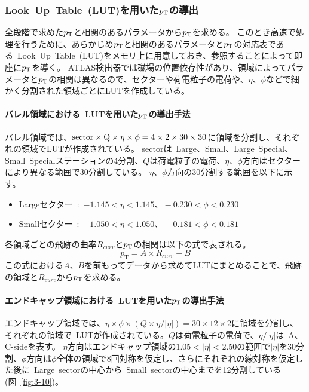 \subsubsection{Look~Up~Table~(LUT)を用いた$p_\mathrm{T}$の導出}
全段階で求めた$p_\mathrm{T}$と相関のあるパラメータから$p_\mathrm{T}$を求める。
このとき高速で処理を行うために、あらかじめ$p_\mathrm{T}$と相関のあるパラメータと$p_\mathrm{T}$の対応表である~Look~Up~Table~(LUT)をメモリ上に用意しておき、参照することによって即座に$p_\mathrm{T}$を導く。
ATLAS検出器では磁場の位置依存性があり、領域によってパラメータと$p_\mathrm{T}$の相関は異なるので、セクターや荷電粒子の電荷や、$\eta$、$\phi$などで細かく分割された領域ごとにLUTを作成している。

\paragraph{バレル領域における~LUTを用いた$p_\mathrm{T}$の導出手法}
バレル領域では、$\rm{sector}\times Q \times \eta \times \phi = 4\times2\times30\times30$に領域を分割し、それぞれの領域でLUTが作成されている。
sectorは~Large、Small、Large~Special、Small~Specialステーションの4分割、$Q$は荷電粒子の電荷、$\eta$、$\phi$方向はセクターにより異なる範囲で30分割している。
$\eta$、$\phi$方向の30分割する範囲を以下に示す。
\begin{itemize}
    \item Largeセクター~:~$-1.145<\eta<1.145、-0.230<\phi<0.230$
    \item Smallセクター~:~$-1.050<\eta<1.050、-0.181<\phi<0.181$
\end{itemize}


各領域ごとの飛跡の曲率$R_{curv}$と$p_\mathrm{T}$の相関は以下の式で表される。
\begin{equation}
    p_{\mathrm{T}}=A \times R_{curv}+B
\end{equation}
この式における$A$、$B$を前もってデータから求めてLUTにまとめることで、飛跡の領域と$R_{curv}$から$p_\mathrm{T}$を求める。


\paragraph{エンドキャップ領域における~LUTを用いた$p_\mathrm{T}$の導出手法}
エンドキャップ領域では、$\eta \times \phi \times (Q \times \eta/|\eta|)= 30\times12\times2$に領域を分割し、それぞれの領域で~LUTが作成されている。$Q$は荷電粒子の電荷で、$\eta/|\eta|$は~A、C-sideを表す。
$\eta$方向はエンドキャップ領域の$1.05<|\eta|<2.50$の範囲で$|\eta|$を30分割、$\phi$方向は$\phi$全体の領域で8回対称を仮定し、さらにそれぞれの線対称を仮定した後に~Large~sectorの中心から~Small~sectorの中心までを12分割している(図~\ref{fig:3-10})。

